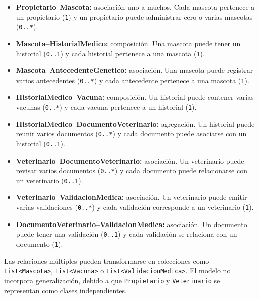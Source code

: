 \documentclass[10pt,a4paper,openany]{report}
\begin{document}
	\begin{itemize}
		\setlength{\itemsep}{2pt}
		\setlength{\parskip}{0pt}
		
		\item \textbf{Propietario--Mascota:}
		asociación uno a muchos. Cada mascota pertenece a un propietario
		(\texttt{1}) y un propietario puede administrar cero o varias
		mascotas (\texttt{0..*}).
		
		\item \textbf{Mascota--HistorialMedico:}
		composición. Una mascota puede tener un historial
		(\texttt{0..1}) y cada historial pertenece a una mascota
		(\texttt{1}).
		
		\item \textbf{Mascota--AntecedenteGenetico:}
		asociación. Una mascota puede registrar varios antecedentes
		(\texttt{0..*}) y cada antecedente pertenece a una mascota
		(\texttt{1}).
		
		\item \textbf{HistorialMedico--Vacuna:}
		composición. Un historial puede contener varias vacunas
		(\texttt{0..*}) y cada vacuna pertenece a un historial
		(\texttt{1}).
		
		\item \textbf{HistorialMedico--DocumentoVeterinario:}
		agregación. Un historial puede reunir varios documentos
		(\texttt{0..*}) y cada documento puede asociarse con un historial
		(\texttt{0..1}).
		
		\item \textbf{Veterinario--DocumentoVeterinario:}
		asociación. Un veterinario puede revisar varios documentos
		(\texttt{0..*}) y cada documento puede relacionarse con un
		veterinario (\texttt{0..1}).
		
		\item \textbf{Veterinario--ValidacionMedica:}
		asociación. Un veterinario puede emitir varias validaciones
		(\texttt{0..*}) y cada validación corresponde a un veterinario
		(\texttt{1}).
		
		\item \textbf{DocumentoVeterinario--ValidacionMedica:}
		asociación. Un documento puede tener una validación
		(\texttt{0..1}) y cada validación se relaciona con un documento
		(\texttt{1}).
		
	\end{itemize}
	
	Las relaciones múltiples pueden transformarse en colecciones como
	\texttt{List<Mascota>}, \texttt{List<Vacuna>} o
	\texttt{List<ValidacionMedica>}. El modelo no incorpora generalización,
	debido a que \texttt{Propietario} y \texttt{Veterinario} se representan
	como clases independientes.
	
\end{document}
